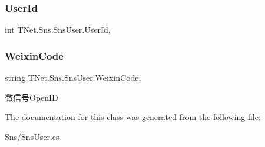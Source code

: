 \subsubsection{\texorpdfstring{User\+Id}{UserId}}
{\footnotesize\ttfamily int T\+Net.\+Sns.\+Sns\+User.\+User\+Id\hspace{0.3cm}{\ttfamily [get]}, {\ttfamily [set]}}





\mbox{\label{class_t_net_1_1_sns_1_1_sns_user_adff9405b9ed63f40662c1532ea738005}} 
\subsubsection{\texorpdfstring{Weixin\+Code}{WeixinCode}}
{\footnotesize\ttfamily string T\+Net.\+Sns.\+Sns\+User.\+Weixin\+Code\hspace{0.3cm}{\ttfamily [get]}, {\ttfamily [set]}}



微信号\+Open\+ID 



The documentation for this class was generated from the following file\+:\begin{DoxyCompactItemize}
\item 
Sns/Sns\+User.\+cs\end{DoxyCompactItemize}
